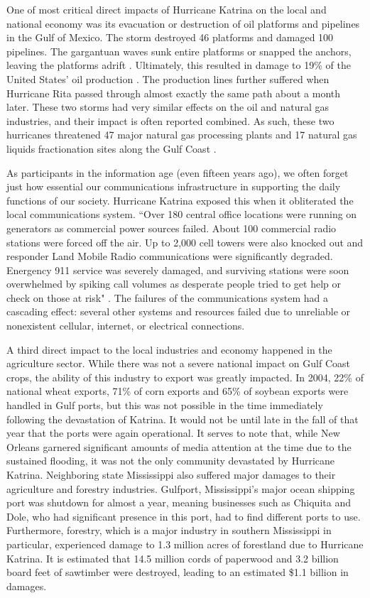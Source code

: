 \documentclass[%
 reprint,
 amsmath,amssymb,
 aps,
]{revtex4-1}
\begin{document}
One of most critical direct impacts of Hurricane Katrina on the local and national economy was its evacuation or destruction of oil platforms and pipelines in the Gulf of Mexico. The storm destroyed 46 platforms and damaged 100 pipelines. The gargantuan waves sunk entire platforms or snapped the anchors, leaving the platforms adrift \cite{Katrina_oil}. Ultimately, this resulted in damage to 19\% of the United States' oil production \cite{Katrina_oil_balance}. The production lines further suffered when Hurricane Rita passed through almost exactly the same path about a month later. These two storms had very similar effects on the oil and natural gas industries, and their impact is often reported combined. As such, these two hurricanes threatened 47 major natural gas processing plants and 17 natural gas liquids fractionation sites along the Gulf Coast \cite{Katrina_naturalGas}.

As participants in the information age (even fifteen years ago), we often forget just how essential our communications infrastructure in supporting the daily functions of our society. Hurricane Katrina exposed this when it obliterated the local communications system. ``Over 180 central office locations were running on generators as commercial power sources failed. About 100 commercial radio stations were forced off the air. Up to 2,000 cell towers were also knocked out and responder Land Mobile Radio communications were significantly degraded. Energency 911 service was severely damaged, and surviving stations were soon overwhelmed by spiking call volumes as desperate people tried to get help or check on those at risk" \cite{MillerPaper}. The failures of the communications system had a cascading effect: several other systems and resources failed due to unreliable or nonexistent cellular, internet, or electrical connections.

A third direct impact to the local industries and economy happened in the agriculture sector. While there was not a severe national impact on Gulf Coast crops, the ability of this industry to export was greatly impacted. In 2004, 22\% of national wheat exports, 71\% of corn exports and 65\% of soybean exports were handled in Gulf ports, but this was not possible in the time immediately following the devastation of Katrina. It would not be until late in the fall of that year that the ports were again operational. \cite{samuelson_2005} It serves to note that, while New Orleans garnered significant amounts of media attention at the time due to the sustained flooding, it was not the only community devastated by Hurricane Katrina. Neighboring state Mississippi also suffered major damages to their agriculture and forestry industries. Gulfport, Mississippi's major ocean shipping port was shutdown for almost a year, meaning businesses such as Chiquita and Dole, who had significant presence in this port, had to find different ports to use. Furthermore, forestry, which is a major industry in southern Mississippi in particular, experienced damage to 1.3 million acres of forestland due to Hurricane Katrina. It is estimated that 14.5 million cords of paperwood and 3.2 billion board feet of sawtimber were destroyed, leading to an estimated \$1.1 billion in damages. \cite{grizzard_2005}
\end{document}
